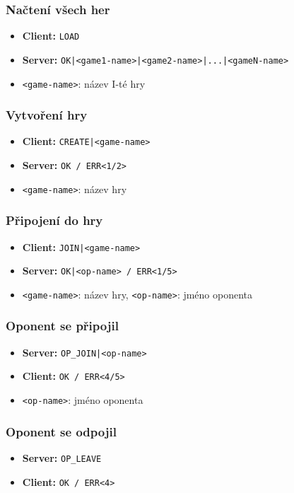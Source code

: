 \documentclass[11pt,a4paper]{article}
\begin{document}
\subsubsection*{Načtení všech her}
\begin{itemize}
	\item \textbf{Client:} \texttt{LOAD}
	\item \textbf{Server:} \texttt{OK|<game1-name>|<game2-name>|...|<gameN-name>}
	\item \texttt{<game-name>}: název I-té hry
\end{itemize}

\subsubsection*{Vytvoření hry}
\begin{itemize}
	\item \textbf{Client:} \texttt{CREATE|<game-name>}
	\item \textbf{Server:} \texttt{OK / ERR<1/2>}
	\item \texttt{<game-name>}: název hry
\end{itemize}

\subsubsection*{Připojení do hry}
\begin{itemize}
	\item \textbf{Client:} \texttt{JOIN|<game-name>}
	\item \textbf{Server:} \texttt{OK|<op-name> / ERR<1/5>}
	\item \texttt{<game-name>}: název hry, \texttt{<op-name>}: jméno oponenta
\end{itemize}

\subsubsection*{Oponent se připojil}
\begin{itemize}
	\item \textbf{Server:} \texttt{OP\_JOIN|<op-name>}
	\item \textbf{Client:} \texttt{OK / ERR<4/5>}
	\item \texttt{<op-name>}: jméno oponenta
\end{itemize}

\subsubsection*{Oponent se odpojil}
\begin{itemize}
	\item \textbf{Server:} \texttt{OP\_LEAVE}
	\item \textbf{Client:} \texttt{OK / ERR<4>}
\end{itemize}
\end{document}

